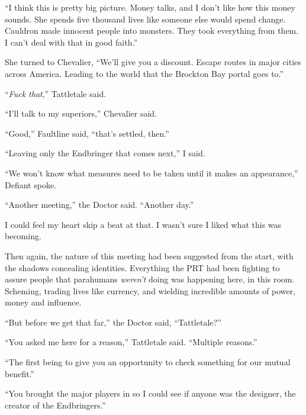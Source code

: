 ``I think this is pretty big picture.  Money talks, and I don't like how this money sounds.  She spends five thousand lives like someone else would spend change.  Cauldron made innocent people into monsters.  They took everything from them.  I can't deal with that in good faith.''



She turned to Chevalier, ``We'll give you a discount.  Escape routes in major cities across America.  Leading to the world that the Brockton Bay portal goes to.''



``\emph{Fuck that},'' Tattletale said.



``I'll talk to my superiors,'' Chevalier said.



``Good,'' Faultline said, ``that's settled, then.''



``Leaving only the Endbringer that comes next,'' I said.



``We won't know what measures need to be taken until it makes an appearance,'' Defiant spoke.



``Another meeting,'' the Doctor said.  ``Another day.''



I could feel my heart skip a beat at that.  I wasn't sure I liked what this was becoming.



Then again, the nature of this meeting had been suggested from the start, with the shadows concealing identities.  Everything the PRT had been fighting to assure people that parahumans \emph{weren't} doing was happening here, in this room.  Scheming, trading lives like currency, and wielding incredible amounts of power, money and influence.



``But before we get that far,'' the Doctor said, ``Tattletale?''



``You asked me here for a reason,'' Tattletale said.  ``Multiple reasons.''



``The first being to give you an opportunity to check something for our mutual benefit.''



``You brought the major players in so I could see if anyone was the designer, the creator of the Endbringers.''



